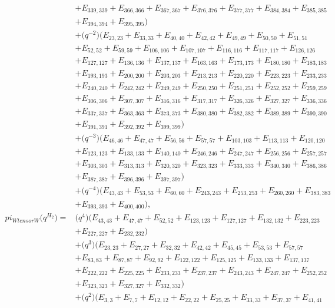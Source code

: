 \documentclass[10pt,a4paper]{amsart}
\numberwithin{equation}{section}
\theoremstyle{definition}
\def\pi{pi}
\def\otimes{ tensor }
\begin{document}
\begin{align*}
&+E_{339,339}+E_{366,366}+E_{367,367}+E_{376,376}+E_{377,377}+E_{384,384}+E_{385,385}\\
&+E_{394,394}+E_{395,395})\\
&+\bigl(q^{-2}\bigr)(E_{23,23}+E_{33,33}+E_{40,40}+E_{42,42}+E_{49,49}+E_{50,50}+E_{51,51}\\
&+E_{52,52}+E_{59,59}+E_{106,106}+E_{107,107}+E_{116,116}+E_{117,117}+E_{126,126}\\
&+E_{127,127}+E_{136,136}+E_{137,137}+E_{163,163}+E_{173,173}+E_{180,180}+E_{183,183}\\
&+E_{193,193}+E_{200,200}+E_{203,203}+E_{213,213}+E_{220,220}+E_{223,223}+E_{233,233}\\
&+E_{240,240}+E_{242,242}+E_{249,249}+E_{250,250}+E_{251,251}+E_{252,252}+E_{259,259}\\
&+E_{306,306}+E_{307,307}+E_{316,316}+E_{317,317}+E_{326,326}+E_{327,327}+E_{336,336}\\
&+E_{337,337}+E_{363,363}+E_{373,373}+E_{380,380}+E_{382,382}+E_{389,389}+E_{390,390}\\
&+E_{391,391}+E_{392,392}+E_{399,399})\\
&+\bigl(q^{-3}\bigr)(E_{46,46}+E_{47,47}+E_{56,56}+E_{57,57}+E_{103,103}+E_{113,113}+E_{120,120}\\
&+E_{123,123}+E_{133,133}+E_{140,140}+E_{246,246}+E_{247,247}+E_{256,256}+E_{257,257}\\
&+E_{303,303}+E_{313,313}+E_{320,320}+E_{323,323}+E_{333,333}+E_{340,340}+E_{386,386}\\
&+E_{387,387}+E_{396,396}+E_{397,397})\\
&+\bigl(q^{-4}\bigr)(E_{43,43}+E_{53,53}+E_{60,60}+E_{243,243}+E_{253,253}+E_{260,260}+E_{383,383}\\
&+E_{393,393}+E_{400,400}),
\\
 \pi_{W \otimes W}\bigl(q^{H_2}\bigr) ={}&
\bigl(q^4\bigr)(E_{43,43}+E_{47,47}+E_{52,52}+E_{123,123}+E_{127,127}+E_{132,132}+E_{223,223}\\
&+E_{227,227}+E_{232,232})\\
&+\bigl(q^3\bigr)(E_{23,23}+E_{27,27}+E_{32,32}+E_{42,42}+E_{45,45}+E_{53,53}+E_{57,57}\\
&+E_{83,83}+E_{87,87}+E_{92,92}+E_{122,122}+E_{125,125}+E_{133,133}+E_{137,137}\\
&+E_{222,222}+E_{225,225}+E_{233,233}+E_{237,237}+E_{243,243}+E_{247,247}+E_{252,252}\\
&+E_{323,323}+E_{327,327}+E_{332,332})\\
&+\bigl(q^2\bigr)(E_{3,3}+E_{7,7}+E_{12,12}+E_{22,22}+E_{25,25}+E_{33,33}+E_{37,37}+E_{41,41}\\

\end{align*}
\end{document}
